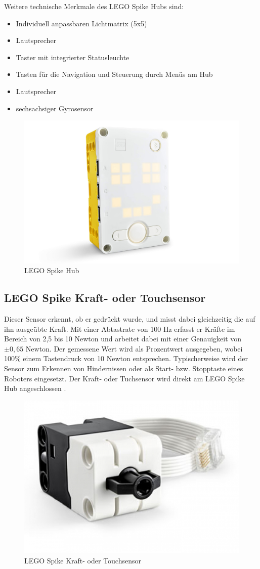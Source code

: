 Weitere technische Merkmale des LEGO Spike Hubs sind:
\begin{itemize}
	\item Individuell anpassbaren Lichtmatrix (5x5)
	\item Lautsprecher
	\item Taster mit integrierter Statusleuchte 
	\item Tasten für die Navigation und Steuerung durch Menüs am Hub 
	\item Lautsprecher
	\item sechsachsiger Gyrosensor 
\end{itemize} 

\begin{figure}[H]
	\centering
	\includegraphics[width=0.55\linewidth]{images/Hub}
	\caption[LEGO Spike Hub Quelle:\autocite{legoeducation2020spikesensors}]{LEGO Spike Hub}
	\label{fig:hub}
\end{figure}

\subsection{LEGO Spike Kraft- oder Touchsensor}
Dieser Sensor erkennt, ob er gedrückt wurde, und misst dabei gleichzeitig die auf ihn ausgeübte Kraft. Mit einer Abtastrate von 100 Hz erfasst er Kräfte im Bereich von 2,5 bis 10 Newton und arbeitet dabei mit einer Genauigkeit von $\pm 0,65$ Newton. Der gemessene Wert wird als Prozentwert ausgegeben, wobei 100\% einem Tastendruck von 10 Newton entsprechen. Typischerweise wird der Sensor zum Erkennen von Hindernissen oder als Start- bzw. Stopptaste eines Roboters eingesetzt. Der Kraft- oder Tuchsensor wird direkt am LEGO Spike Hub angeschlossen \autocite{legoeducation2020spikesensors}.

\begin{figure}[H]
	\centering
	\includegraphics[width=0.4\linewidth]{images/Kraftsensor}
	\caption[LEGO Spike Kraft- oder Touchsensor Quelle:\autocite{legoeducation2020spikesensors}]{LEGO Spike Kraft- oder Touchsensor}
	\label{fig:kraftsensor}
\end{figure}

